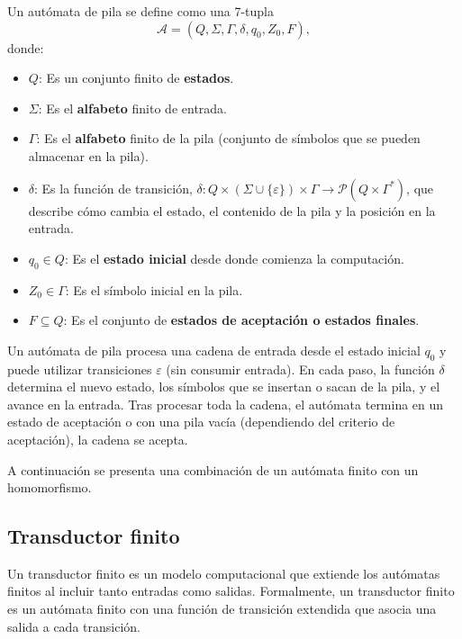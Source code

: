 Un autómata de pila se define como una 7-tupla
\[
      \mathcal{A} = (Q, \Sigma, \Gamma, \delta, q_0, Z_0, F),
\]
donde:

\begin{itemize}
      \item $Q$: Es un conjunto finito de \textbf{estados}.
      \item $\Sigma$: Es el \textbf{alfabeto} finito de entrada.
      \item $\Gamma$: Es el \textbf{alfabeto} finito de la pila (conjunto de símbolos que se pueden almacenar en la pila).
      \item $\delta$: Es la función de transición, $\delta: Q \times (\Sigma \cup \{\varepsilon\}) \times \Gamma \to \mathcal{P}(Q \times \Gamma^*)$, que describe cómo cambia el estado, el contenido de la pila y la posición en la entrada.
      \item $q_0 \in Q$: Es el \textbf{estado inicial} desde donde comienza la computación.
      \item $Z_0 \in \Gamma$: Es el símbolo inicial en la pila.
      \item $F \subseteq Q$: Es el conjunto de \textbf{estados de aceptación o estados finales}.
\end{itemize}

Un autómata de pila procesa una cadena de entrada desde el estado inicial $q_0$ y
puede utilizar transiciones $\varepsilon$ (sin consumir entrada). En cada paso, la función $\delta$
determina el nuevo estado, los símbolos que se insertan o sacan de la pila, y el avance en la entrada.
Tras procesar toda la cadena, el autómata termina en un estado de aceptación o con una pila vacía 
(dependiendo del criterio de aceptación), la cadena se acepta.

A continuación se presenta una combinación de un autómata finito con un homomorfismo. 
\subsection{Transductor finito}

Un transductor finito \cite{geeksforgeeks_finite_state_transducer} es un modelo computacional que extiende los autómatas finitos al incluir tanto entradas como salidas.
Formalmente, un transductor finito es un autómata finito con una función de transición extendida
que asocia una salida a cada transición.


